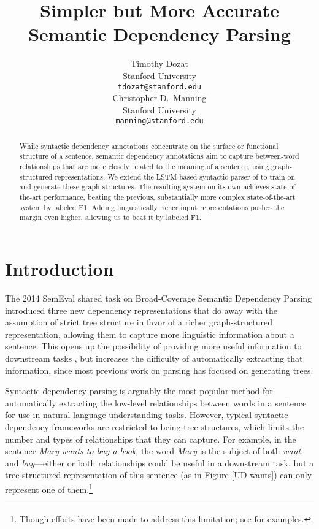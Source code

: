 \documentclass[11pt,a4paper]{article}
\title{Simpler but More Accurate Semantic Dependency Parsing}
\author{Timothy Dozat\\
        Stanford University\\
        {\tt tdozat@stanford.edu}\\\And
        Christopher D.\ Manning\\
        Stanford University\\
        {\tt manning@stanford.edu}\\}
\date{}
\begin{document}
\maketitle
\begin{abstract}
  While syntactic dependency annotations concentrate on the surface or functional structure of a sentence, semantic dependency annotations aim to capture between-word relationships that are more closely related to the meaning of a sentence, using graph-structured representations. We extend the LSTM-based syntactic parser of \citet{DozatManning2017} to train on and generate these graph structures. The resulting system on its own achieves state-of-the-art performance, beating the previous, substantially more complex state-of-the-art system by  labeled F1. Adding linguistically richer input representations pushes the margin even higher, allowing us to beat it by  labeled F1.
\end{abstract} 

\section{Introduction}
The 2014 SemEval shared task on Broad-Coverage Semantic Dependency Parsing \citep{Oepenetal2014} introduced three new dependency representations that do away with the assumption of strict tree structure in favor of a richer graph-structured representation, allowing them to capture more linguistic information about a sentence. This opens up the possibility of providing more useful information to downstream tasks \citep{Reddyetal2017,Schusteretal2017}, but increases the difficulty of automatically extracting that information, since most previous work on parsing has focused on generating trees.

Syntactic dependency parsing is arguably the most popular method for automatically extracting the low-level relationships between words in a sentence for use in natural language understanding tasks. However, typical syntactic dependency frameworks are restricted to being tree structures, which limits the number and types of relationships that they can capture. For example, in the sentence \emph{Mary wants to buy a book}, the word \emph{Mary} is the subject of both \emph{want} and \emph{buy}---either or both relationships could be useful in a downstream task, but a tree-structured representation of this sentence (as in Figure \ref{UD-wants}) can only represent one of them.\footnote{Though efforts have been made to address this limitation; see \citet{deMarneffeetal2006,Nivreetal2016,SchusterManning2016,Canditoetal2017} for examples.} 
\end{document}
